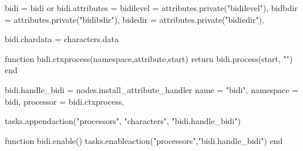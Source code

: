 

\startmodule[bidi]

\unprotect

\startluacode

bidi            = bidi or { }
bidi.attributes = {
    bidilevel   = attributes.private("bidilevel"),
    bidbdir     = attributes.private("bidibdir"),
    bidedir     = attributes.private("bidiedir"),
}

bidi.chardata   = characters.data

\stopluacode


\startluacode

function bidi.ctxprocess(namespace,attribute,start)
    return bidi.process(start, "")
end

bidi.handle_bidi = nodes.install_attribute_handler {
    name      = "bidi",
    namespace = bidi,
    processor = bidi.ctxprocess,
}

tasks.appendaction("processors", "characters",  "bidi.handle_bidi")

function bidi.enable()
    tasks.enableaction("processors","bidi.handle_bidi")
end

\stopluacode

\protect \endinput
